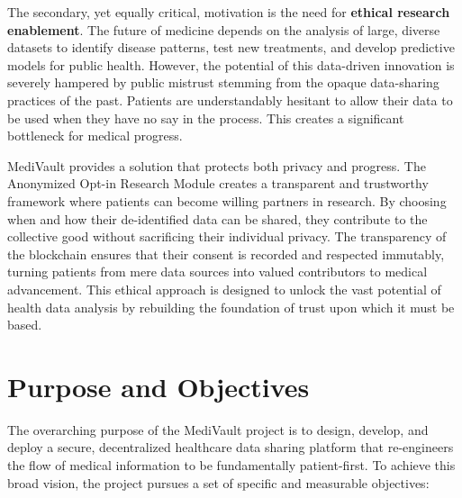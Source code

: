 The secondary, yet equally critical, motivation is the need for \textbf{ethical research enablement}. The future of medicine depends on the analysis of large, diverse datasets to identify disease patterns, test new treatments, and develop predictive models for public health. However, the potential of this data-driven innovation is severely hampered by public mistrust stemming from the opaque data-sharing practices of the past. Patients are understandably hesitant to allow their data to be used when they have no say in the process. This creates a significant bottleneck for medical progress.

MediVault provides a solution that protects both privacy and progress. The Anonymized Opt-in Research Module creates a transparent and trustworthy framework where patients can become willing partners in research. By choosing when and how their de-identified data can be shared, they contribute to the collective good without sacrificing their individual privacy. The transparency of the blockchain ensures that their consent is recorded and respected immutably, turning patients from mere data sources into valued contributors to medical advancement. This ethical approach is designed to unlock the vast potential of health data analysis by rebuilding the foundation of trust upon which it must be based.

\section{Purpose and Objectives}
The overarching purpose of the MediVault project is to design, develop, and deploy a secure, decentralized healthcare data sharing platform that re-engineers the flow of medical information to be fundamentally patient-first. To achieve this broad vision, the project pursues a set of specific and measurable objectives:

